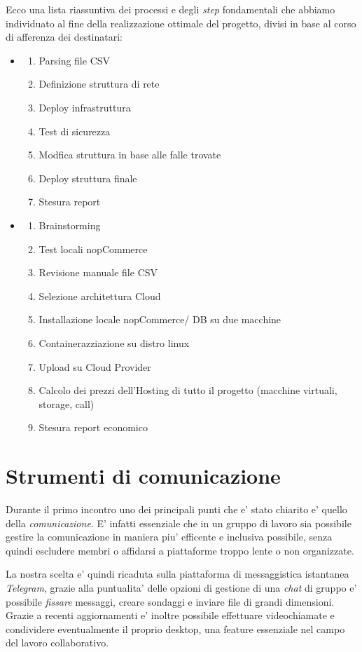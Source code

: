\documentclass[a4paper]{report}
\begin{document}
	Ecco una lista riassuntiva dei processi e degli \emph{step} fondamentali che abbiamo individuato al fine della
	realizzazione ottimale del progetto, divisi in base al corso di afferenza dei destinatari:
	\begin{itemize}
		\item \begin{enumerate}
				\item Parsing file CSV
				\item Definizione struttura di rete
				\item Deploy infrastruttura
				\item Test di sicurezza
				\item Modfica struttura in base alle falle trovate
				\item Deploy struttura finale
				\item Stesura report
			\end{enumerate}
		\item \begin{enumerate}
				\item Brainstorming
				\item Test locali nopCommerce
				\item Revisione manuale file CSV
				\item Selezione architettura Cloud
				\item Installazione locale nopCommerce/ DB su due macchine
				\item Containerazziazione su distro linux
				\item Upload su Cloud Provider 
				\item Calcolo dei prezzi dell'Hosting di tutto il progetto (macchine virtuali, storage, call)
				\item Stesura report economico
			\end{enumerate}
	\end{itemize}
	\section{Strumenti di comunicazione}
		Durante il primo incontro uno dei principali punti che e' stato chiarito e' quello della \emph{comunicazione}.
		E' infatti essenziale che in un gruppo di lavoro sia possibile gestire la comunicazione in maniera piu'
		efficente e inclusiva possibile, senza quindi escludere membri o affidarsi a piattaforme troppo lente o non
		organizzate.
		
		La nostra scelta e' quindi ricaduta sulla piattaforma di messaggistica istantanea \emph{Telegram}, grazie alla
		puntualita' delle opzioni di gestione di una \emph{chat} di gruppo e' possibile \emph{fissare} messaggi, creare
		sondaggi e inviare file di grandi dimensioni. Grazie a recenti aggiornamenti e' inoltre possibile effettuare
		videochiamate e condividere eventualmente il proprio desktop, una feature essenziale nel campo del lavoro
		collaborativo.
\end{document}
